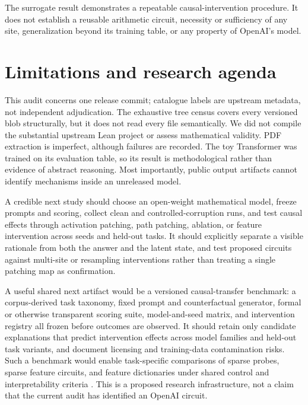 \documentclass[11pt]{article}
\begin{document}
The surrogate result demonstrates a repeatable causal-intervention procedure.
It does not establish a reusable arithmetic circuit, necessity or sufficiency
of any site, generalization beyond its training table, or any property of
OpenAI's model.

\section{Limitations and research agenda}

This audit concerns one release commit; catalogue labels are upstream metadata,
not independent adjudication. The exhaustive tree census covers every
versioned blob structurally, but it does not read every file semantically. We
did not compile the substantial upstream Lean project or assess mathematical
validity. PDF extraction is imperfect, although failures are recorded. The toy
Transformer was trained on its evaluation table, so its result is methodological
rather than evidence of abstract reasoning. Most importantly, public output
artifacts cannot identify mechanisms inside an unreleased model.

A credible next study should choose an open-weight mathematical model, freeze
prompts and scoring, collect clean and controlled-corruption runs, and test
causal effects through activation patching, path patching, ablation, or feature
intervention across seeds and held-out tasks. It should explicitly separate a
visible rationale from both the answer and the latent state, and test proposed
circuits against multi-site or resampling interventions rather than treating a
single patching map as confirmation.

A useful shared next artifact would be a versioned causal-transfer benchmark:
a corpus-derived task taxonomy, fixed prompt and counterfactual generator,
formal or otherwise transparent scoring suite, model-and-seed matrix, and
intervention registry all frozen before outcomes are observed. It should retain
only candidate explanations that predict intervention effects across model
families and held-out task variants, and document licensing and training-data
contamination risks. Such a benchmark would enable task-specific comparisons
of sparse probes, sparse feature circuits, and feature dictionaries under
shared control and interpretability criteria
\citep{gurnee2023haystack,marks2024sparsefeature,makelov2024sae}. This is a
proposed research infrastructure, not a claim that the current audit has
identified an OpenAI circuit.
\end{document}
